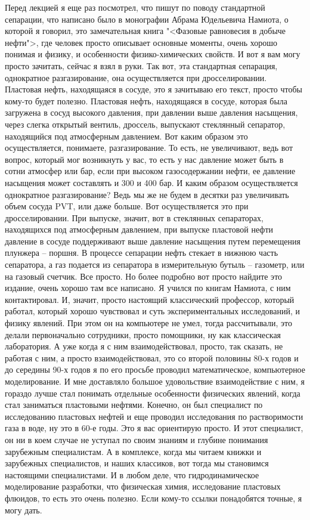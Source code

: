 \documentclass[main.tex]{subfiles}
\begin{document}
Перед лекцией я еще раз посмотрел, что пишут по поводу стандартной сепарации, что написано было в монографии Абрама Юдельевича Намиота, о которой я говорил, это замечательная книга "<Фазовые равновесия в добыче нефти">, где человек просто описывает основные моменты, очень хорошо понимая и физику, и особенности физико-химических свойств.
И вот я вам могу просто зачитать, сейчас я взял в руки.
Так вот, эта стандартная сепарация, однократное разгазирование, она осуществляется при дросселировании.
Пластовая нефть, находящаяся в сосуде, это я зачитываю его текст, просто чтобы кому-то будет полезно.
Пластовая нефть, находящаяся в сосуде, которая была загружена в сосуд высокого давления, при давлении выше давления насыщения, через слегка открытый вентиль, дроссель, выпускают стеклянный сепаратор, находящийся под атмосферным давлением.
Вот каким образом это осуществляется, понимаете, разгазирование.
То есть, не увеличивают, ведь вот вопрос, который мог возникнуть у вас, то есть у нас давление может быть в сотни атмосфер или бар, если при высоком газосодержании нефти, ее давление насыщения может составлять и 300 и 400 бар.
И каким образом осуществляется однократное разгазирование?
Ведь мы же не будем в десятки раз увеличивать объем сосуда PVT, или даже больше.
Вот осуществляется это при дросселировании.
При выпуске, значит, вот в стеклянных сепараторах, находящихся под атмосферным давлением, при выпуске пластовой нефти давление в сосуде поддерживают выше давление насыщения путем перемещения плунжера -- поршня.
В процессе сепарации нефть стекает в нижнюю часть сепаратора, а газ подается из сепаратора в измерительную бутыль -- газометр, или на газовый счетчик.
Все просто.
Но более подробно вот просто найдите это издание, очень хорошо там все написано.
Я учился по книгам Намиота, с ним контактировал.
И, значит, просто настоящий классический профессор, который работал, который хорошо чувствовал и суть экспериментальных исследований, и физику явлений.
При этом он на компьютере не умел, тогда рассчитывали, это делали первоначально сотрудники, просто помощники, ну как классическая лаборатория.
А уже когда я с ним взаимодействовал, просто, так сказать, не работая с ним, а просто взаимодействовал, это со второй половины 80-х годов и до середины 90-х годов я по его просьбе проводил математическое, компьютерное моделирование.
И мне доставляло большое удовольствие взаимодействие с ним, я гораздо лучше стал понимать отдельные особенности физических явлений, когда стал заниматься пластовыми нефтями.
Конечно, он был специалист по исследованию пластовых нефтей и еще проводил исследования по растворимости газа в воде, ну это в 60-е годы.
Это я вас ориентирую просто.
И этот специалист, он ни в коем случае не уступал по своим знаниям и глубине понимания зарубежным специалистам.
А в комплексе, когда мы читаем книжки и зарубежных специалистов, и наших классиков, вот тогда мы становимся настоящими специалистами.
И в любом деле, что гидродинамическое моделирование разработки, что физическая химия, исследование пластовых флюидов, то есть это очень полезно.
Если кому-то ссылки понадобятся точные, я могу дать.
\end{document}
